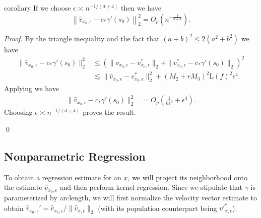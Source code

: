 \documentclass[11pt]{article}
\begin{document}
\begin{restatable}{corollary}{} \label{thm: velocity risk}
    If we choose $\epsilon \asymp n^{-1/(d+4)}$ then we have
    \[\left\|\hat{v}_{x_0, \epsilon} - c_*\gamma'(s_0)\right\|_{2}^2  =  O_p\left(n^{-\frac{4}{d+4}}\right). \]
\end{restatable}
\noindent \textit{Proof.} By the triangle inequality and the fact that $(a + b)^2 \leq 2(a^2 + b^2)$  we have
\begin{align*}
    \|\hat{v}_{x_0, \epsilon} - c_*\gamma'(s_0)\|_{2}^2 &\leq \left(\|\hat{v}_{x_0, \epsilon} - v^*_{x_0, \epsilon}\|_{2} + \|v^*_{x_0, \epsilon}  - c_*\gamma'(s_0)\|_{2}\right)^2 \\
    &\lesssim  \|\hat{v}_{x_0, \epsilon} - v^*_{x_0, \epsilon} \|_{2}^2+  (M_2 + rM_3)^2\text{L}(f)^2\epsilon^4.
\end{align*}
Applying  we have
\begin{align*}
   \|\hat{v}_{x_0, \epsilon} - c_*\gamma'(s_0)\|_{2}^2 &=  O_p\left(\frac{1}{n\epsilon^d} + \epsilon^4\right).
\end{align*}
Choosing $\epsilon \asymp n^{-1/(d+4)}$ proves the result.

\qed{}

\subsection{Nonparametric Regression}  \label{sec: regression results presentation}

To obtain a regression estimate for an $x$, we will project its neighborhood onto the estimate $\hat{v}_{x_0, \epsilon}$ and then perform kernel regression. Since we stipulate that $\gamma$ is parameterized by arclength, we will first normalize the velocity vector estimate to obtain $\hat{v}_{x_0, \epsilon}' = \hat{v}_{x_0, \epsilon}/\|\hat{v}_{x, \epsilon}\|_2$ (with its population counterpart being $v'^{*}_{x, \epsilon}$). 
\end{document}
